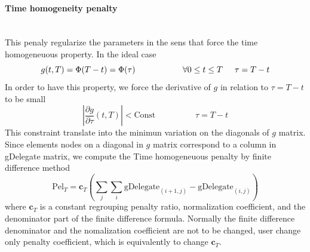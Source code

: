 \documentclass[a4paper,10pt]{article}
\begin{document}
\paragraph{Time homogeneity penalty}\mbox{}\\
This penaly regularize the parameters in the sens that force the time homogeneuous property. In the ideal case
\[
g(t,T) = \Phi(T-t) = \Phi(\tau)   \hspace{2cm} \forall 0 \leq t \leq T \hspace{0.5cm} \tau = T-t
\] 
In order to have this property, we force the derivative of $g$ in relation to $\tau=T-t$ to be small
\[
 |\frac{\partial g}{\partial \tau}(t,T) | < \text{Const} \hspace{2cm} \tau = T-t
\]
This constraint translate into the minimun variation on the diagonals of $g$ matrix. Since elements nodes on a diagonal in $g$ matrix correspond to a column in gDelegate matrix, we compute the Time homogeneuous penalty by finite difference method
\[
\text{Pel}_{T} = \textbf{c}_{T}(\sum_j \sum_i \text{gDelegate}_{(i+1,j)} - \text{gDelegate}_{(i,j)} )
\]
where $\textbf{c}_{T}$ is a constant regrouping penalty ratio, normalization coefficient, and the denominator part of the finite difference formula. Normally the finite difference denominator and the nomalization coefficient are not to be changed, user change only penalty coefficient, which is equivalently to change $\textbf{c}_{T}$.  
\end{document}
